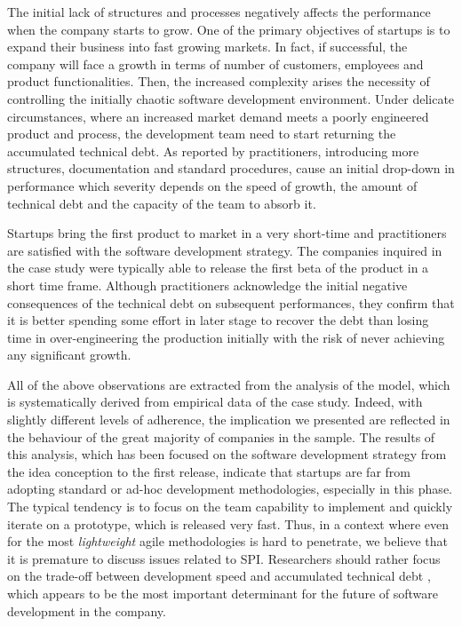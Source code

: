 \documentclass[10pt,journal,letterpaper,compsoc]{IEEEtran}
\begin{document}
\begin{compactitem}
\item The initial lack of structures and processes negatively affects the performance when the company starts to grow. One of the primary objectives of startups is to expand their business into fast growing markets. In fact, if successful, the company will face a growth in terms of number of customers, employees and product functionalities. Then, the increased complexity arises the necessity of controlling the initially chaotic software development environment. Under delicate circumstances, where an increased market demand meets a poorly engineered product and process,  the development team need to start returning the accumulated technical debt. As reported by practitioners, introducing more structures, documentation and standard procedures, cause an initial drop-down in performance which severity depends on the speed of growth, the amount of technical debt and the capacity of the team to absorb it. 

\item Startups bring the first product to market in a very short-time and practitioners are satisfied with the software development strategy. The companies inquired in the case study were typically able to release the first beta of the product in a short time frame. Although practitioners acknowledge the initial negative consequences of the technical debt on subsequent performances, they confirm that it is better spending some effort in later stage to recover the debt than losing time in over-engineering the production initially with the risk of never achieving any significant growth. 
\end{compactitem}


All of the above observations are extracted from the analysis of the model, which is systematically derived from empirical data of the case study. Indeed, with slightly different levels of adherence, the implication we presented are reflected in the behaviour of the great majority of companies in the sample. The results of this analysis, which has been focused on the software development strategy from the idea conception to the first release, indicate that startups are far from adopting standard or ad-hoc development methodologies, especially in this phase. The typical tendency is to focus on the team capability to implement and quickly iterate on a prototype, which is released very fast. Thus, in a context where even for the most \textit{lightweight} agile methodologies is hard to penetrate, we believe that it is premature to discuss issues related to SPI. Researchers should rather focus on the trade-off between development speed and accumulated technical debt \cite{Brown:2010:MTD:1882362.1882373}, which 
appears to be the most important determinant for the future of software development in the company.
\end{document}
